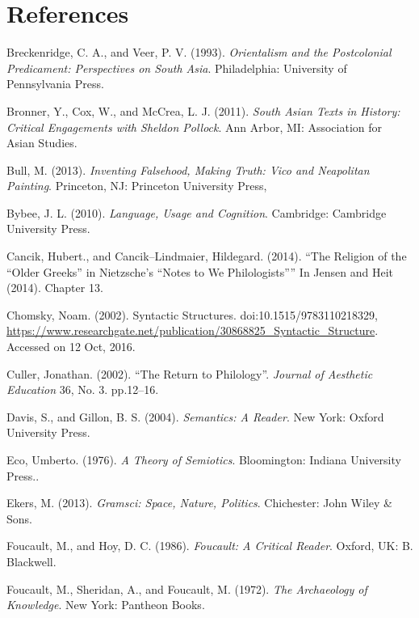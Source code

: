 \newpage


\section*{References}

\begin{thebibliography}{99}
 Breckenridge, C. A., and Veer, P. V. (1993). \textit{Orientalism and the Postcolonial Predicament: Perspectives on South Asia}. Philadelphia: University of Pennsylvania Press.

  Bronner, Y., Cox, W., and McCrea, L. J. (2011). \textit{South Asian Texts in History: Critical Engagements with Sheldon Pollock}. Ann Arbor, MI: Association for Asian Studies.

  Bull, M. (2013). \textit{Inventing Falsehood, Making Truth: Vico and Neapolitan Painting}. Princeton, NJ: Princeton University Press,

  Bybee, J. L. (2010). \textit{Language, Usage and Cognition}. Cambridge: Cambridge University Press.

  Cancik, Hubert., and Cancik–Lindmaier, Hildegard. (2014). “The Religion of the “Older Greeks” in Nietzsche’s “Notes to We Philologists”” In Jensen and Heit (2014). Chapter 13.

  Chomsky, Noam. (2002). Syntactic Structures. doi:10.1515/9783110218329, \url{https://www.researchgate.net/publication/30868825_Syntactic_Structure}. Accessed on 12 Oct, 2016.

  Culler, Jonathan. (2002). “The Return to Philology”. \textit{Journal of Aesthetic Education} 36, No. 3. pp.12–16.

  Davis, S., and Gillon, B. S. (2004). \textit{Semantics: A Reader}. New York: Oxford University Press.

  Eco, Umberto. (1976). \textit{A Theory of Semiotics}. Bloomington: Indiana University Press..

  Ekers, M. (2013). \textit{Gramsci: Space, Nature, Politics}. Chichester: John Wiley \& Sons.

  Foucault, M., and Hoy, D. C. (1986). \textit{Foucault: A Critical Reader}. Oxford, UK: B. Blackwell.

  Foucault, M., Sheridan, A., and Foucault, M. (1972). \textit{The Archaeology of Knowledge}. New York: Pantheon Books.


\end{thebibliography}
